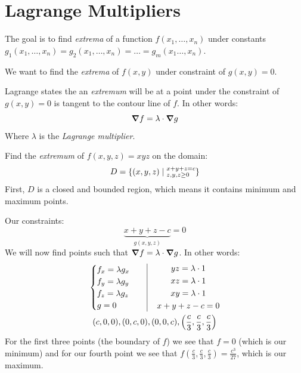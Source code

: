 \documentclass[00_complete]{subfiles}
\begin{document}
\section{Lagrange Multipliers}
The goal is to find \emph{extrema} of a function $f(x_1,\dots,x_n)$ under
constants $g_1(x_1,\dots,x_n)=g_2(x_1,\dots,x_n)=\dots=g_m(x_1\dots,x_n)$.
\begin{example}
    We want to find the \emph{extrema} of $f(x,y)$ under constraint of
    $g(x,y)=0$.

    Lagrange states the an \emph{extremum} will be at a point under the
    constraint of $g(x,y)=0$ is tangent to the contour line of $f$. In other
    words:
    $$\grad f = \lambda \cdot \grad g$$
    Where $\lambda$ is the \emph{Lagrange multiplier}.
\end{example}
\begin{example}
    Find the \emph{extremum} of $f(x,y,z)=xyz$ on the domain:
    $$D=\{(x,y,z) \mid
    \begin{subarray}{m}
        x+y+z=c \\ z,y,z \geq 0
    \end{subarray}\}$$
    First, $D$ is a closed and bounded region, which means it contains minimum
    and maximum points.

    Our constraints:
    $$\underbrace{x+y+z-c}_{g(x,y,z)}=0$$
    We will now find points such that $\grad f= \lambda \cdot \grad g$. In
    other words:
    \begin{gather*}
    \begin{cases}
        f_x=\lambda g_x \\
        f_y=\lambda g_y \\
        f_z=\lambda g_z \\
        g=0
    \end{cases} \quad \vline \quad
    \begin{gathered}
        yz=\lambda \cdot 1 \\
        xz=\lambda \cdot 1 \\
        xy=\lambda \cdot 1 \\
        x+y+z -c=0
    \end{gathered} \\
    (c,0,0), (0,c,0), (0,0,c), \left(\frac{c}{3},\frac{c}{3},\frac{c}{3}\right)
    \end{gather*}
    For the first three points (the boundary of $f$) we see that $f=0$ (which
    is our minimum) and for our fourth point we see that
    $f(\frac{c}{3},\frac{c}{3},\frac{c}{3})=\frac{c^3}{27}$, which is our maximum.
\end{example}
\end{document}
